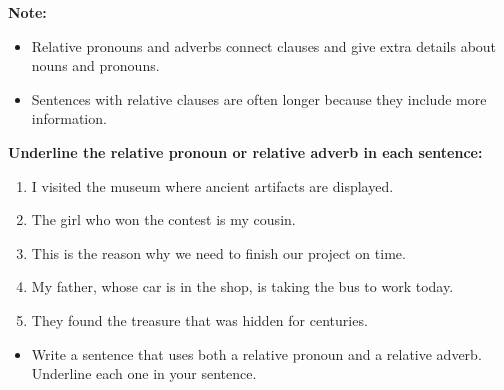 \documentclass[12pt]{article}
\begin{document}
\vspace{1em}

\begin{tcolorbox}[colframe=black!40, colback=gray!5, 
coltitle=black, colbacktitle=black!20, fonttitle=\bfseries\Large, 
title=Additional Notes, halign title=center, left=5pt, right=5pt, top=5pt, bottom=15pt]
\textbf{Note:}
\begin{itemize}
    \item Relative pronouns and adverbs connect clauses and give extra details about nouns and pronouns.
    \item Sentences with relative clauses are often longer because they include more information.
\end{itemize}
\end{tcolorbox}

\vspace{1em}

\begin{tcolorbox}[colframe=black!60, colback=white, 
coltitle=black, colbacktitle=black!15, fonttitle=\bfseries\Large, 
title=Independent Practice, halign title=center, left=10pt, right=10pt, top=10pt, bottom=15pt]
\textbf{Underline the relative pronoun or relative adverb in each sentence:}
\begin{enumerate}[itemsep=3em]
    \item I visited the museum where ancient artifacts are displayed.
    \item The girl who won the contest is my cousin.
    \item This is the reason why we need to finish our project on time.
    \item My father, whose car is in the shop, is taking the bus to work today.
    \item They found the treasure that was hidden for centuries.
\end{enumerate}
\end{tcolorbox}

\vspace{1em}

\begin{tcolorbox}[colframe=black!60, colback=white, 
coltitle=black, colbacktitle=black!15, fonttitle=\bfseries\Large, 
title=Exit Ticket, halign title=center, left=10pt, right=10pt, top=10pt, bottom=15pt]

\begin{itemize}
    \item Write a sentence that uses both a relative pronoun and a relative adverb. Underline each one in your sentence.


\vspace{2em}
     \underline{\hspace{14.6cm}}  
    \\[0.8cm] \underline{\hspace{14.6cm}}  
    \\[0.8cm] \underline{\hspace{14.6cm}}


\end{itemize}
\end{tcolorbox}
\end{document}

